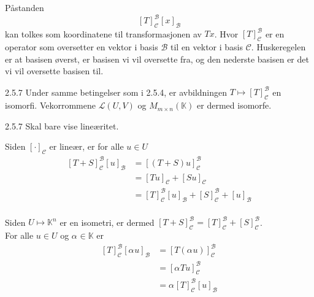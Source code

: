 \documentclass[a4paper,norsk]{article}
\begin{document}
Påstanden 
\[
    \left[ T \right] _{\mathcal{C}}^{\mathcal{B}} \left[ x \right] _{\mathcal{B}}
\]
kan tolkes som koordinatene til transformasjonen av $ Tx $. Hvor $ \left[ T \right] _{\mathcal{C}}^{\mathcal{B}} $ er en operator som oversetter en vektor i basis $ \mathcal{B} $  til en vektor i basis $ \mathcal{C} $. Huskeregelen er at basisen øverst, er basisen vi vil oversette fra, og den nederste basisen er det vi vil oversette basisen til.

\begin{theorembox}{2.5.7}{}
Under samme betingelser som i 2.5.4, er avbildningen $ T \mapsto \left[ T \right] _{\mathcal{C}}^{\mathcal{B}} $ en isomorfi. Vekorrommene $ \mathcal{L} \left( U, V\right)  $ og $ M_{m \times n}(\mathbb{K}) $ er dermed isomorfe.

\begin{proofbox}{2.5.7}{}
Skal bare vise lineæritet.

Siden $ \left[ \cdot \right] _{\mathcal{C}} $ er lineær, er for alle $ u \in  U $ 
\begin{align*}
  \left[ T + S \right] _{\mathcal{C}}^{\mathcal{B}} \left[ u \right] _{\mathcal{B}} &= \left[ \left( T + S \right) u  \right] _{\mathcal{C}}^{\mathcal{B}} \\
  &= \left[ Tu \right] _{\mathcal{C}} + \left[ Su \right] _{\mathcal{C}} \\
  &= \left[ T \right] _{\mathcal{C}}^{\mathcal{B}} \left[ u \right] _{\mathcal{B}} + \left[ S \right] _{\mathcal{C}}^{\mathcal{B}} + \left[ u \right] _{\mathcal{B}}\\
\end{align*}

Siden $ U \mapsto \mathbb{K}^n $ er en isometri, er dermed $ \left[ T + S \right]_{\mathcal{C}}^{\mathcal{B}} = \left[ T \right] _{\mathcal{C}}^{\mathcal{B}} + \left[ S \right] _{\mathcal{C}}^{\mathcal{B}}  $. \\


For alle $ u \in U $ og $ \alpha_{}^{} \in  \mathbb{K}$ er 
\begin{align*}
  \left[ T \right] _{\mathcal{C}}^{\mathcal{B}} \left[ \alpha_{}^{} u \right] _{\mathcal{B}} &= \left[ T \left( \alpha_{}^{} u \right)  \right]_{\mathcal{C}}^{\mathcal{B}} \\
  &= \left[ \alpha_{}^{} T u \right]  _{\mathcal{C}}^{\mathcal{B}}\\
  &= \alpha_{}^{} \left[ T \right] _{\mathcal{C}}^{\mathcal{B}} \left[ u \right] _{\mathcal{B}}
\end{align*}
\end{proofbox}
\end{theorembox}
\end{document}
